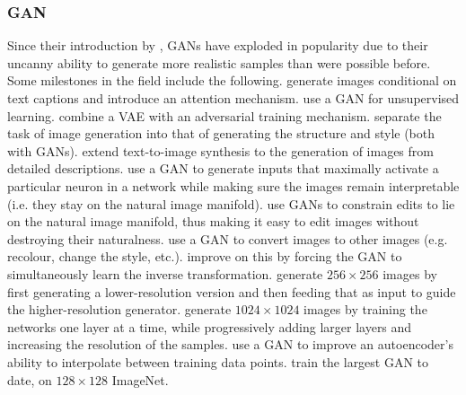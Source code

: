 \documentclass[10pt,a4paper]{article}
\begin{document}
\subsubsection{GAN}

Since their introduction by \cite{gan}, GANs have exploded in popularity due to their uncanny ability to generate more realistic samples than were possible before. Some milestones in the field include the following. \cite{imagefromcaption} generate images conditional on text captions and introduce an attention mechanism. \cite{unsupervisedgan} use a GAN for unsupervised learning. \cite{vaegan} combine a VAE with an adversarial training mechanism. \cite{structurestylegan} separate the task of image generation into that of generating the structure and style (both with GANs). \cite{texttoimagegan} extend text-to-image synthesis to the generation of images from detailed descriptions. \cite{preferredinputs} use a GAN to generate inputs that maximally activate a particular neuron in a network while making sure the images remain interpretable (i.e. they stay on the natural image manifold). \cite{manifoldmanipulation} use GANs to constrain edits to lie on the natural image manifold, thus making it easy to edit images without destroying their naturalness. \cite{imagetoimagegan} use a GAN to convert images to other images (e.g. recolour, change the style, etc.). \cite{cyclegan} improve on this by forcing the GAN to simultaneously learn the inverse transformation. \cite{stackgan} generate $256\times 256$ images by first generating a lower-resolution version and then feeding that as input to guide the higher-resolution generator. \cite{progressivegrowing} generate $1024\times 1024$ images by training the networks one layer at a time, while progressively adding larger layers and increasing the resolution of the samples. \cite{vaeganinterpolation} use a GAN to improve an autoencoder's ability to interpolate between training data points. \cite{largegan} train the largest GAN to date, on $128\times 128$ ImageNet.
\end{document}
